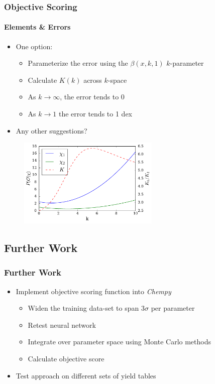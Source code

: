 \documentclass{beamer}
\begin{document}
\begin{frame}
\frametitle{Objective Scoring}
\framesubtitle{Elements \& Errors}
\begin{itemize}
\item One option:
\begin{itemize}
\item Parameterize the error using the $\beta(x,k,1)$ $k$-parameter
\item Calculate $K(k)$ across $k$-space
\item As $k\rightarrow \infty$, the error tends to 0
\item As $k\rightarrow 1$ the error tends to 1 dex
\end{itemize}
\item Any other suggestions?
\end{itemize}
\begin{figure}
\centering
\includegraphics[width=0.6\textwidth]{Kplot.pdf}
\end{figure}
\end{frame}

\subsection{Further Work}
\begin{frame}
\frametitle{Further Work}
\begin{itemize}
\item Implement objective scoring function into \textit{Chempy}
\begin{itemize}
\item Widen the training data-set to span 3$\sigma$ per parameter
\item Retest neural network
\item Integrate over parameter space using Monte Carlo methods
\item Calculate objective score
\end{itemize}
\item Test approach on different sets of yield tables
\end{itemize}
\end{frame}
\end{document}
